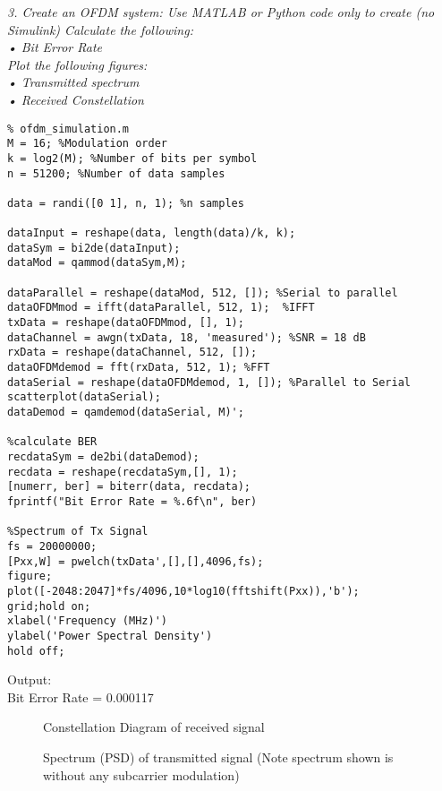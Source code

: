 \documentclass[a4paper]{article}
\begin{document}
\bigskip
\textit{3. Create an OFDM system: Use MATLAB or Python code only to create (no Simulink) Calculate the following:\\
    • Bit Error Rate\\
Plot the following figures:\\
    • Transmitted spectrum\\
    • Received Constellation\\
}
\bigskip
{}
\begin{verbatim}
% ofdm_simulation.m
M = 16; %Modulation order
k = log2(M); %Number of bits per symbol
n = 51200; %Number of data samples

data = randi([0 1], n, 1); %n samples

dataInput = reshape(data, length(data)/k, k);
dataSym = bi2de(dataInput);
dataMod = qammod(dataSym,M);

dataParallel = reshape(dataMod, 512, []); %Serial to parallel
dataOFDMmod = ifft(dataParallel, 512, 1);  %IFFT
txData = reshape(dataOFDMmod, [], 1);
dataChannel = awgn(txData, 18, 'measured'); %SNR = 18 dB
rxData = reshape(dataChannel, 512, []);
dataOFDMdemod = fft(rxData, 512, 1); %FFT
dataSerial = reshape(dataOFDMdemod, 1, []); %Parallel to Serial
scatterplot(dataSerial);
dataDemod = qamdemod(dataSerial, M)';

%calculate BER
recdataSym = de2bi(dataDemod);
recdata = reshape(recdataSym,[], 1);
[numerr, ber] = biterr(data, recdata);
fprintf("Bit Error Rate = %.6f\n", ber)

%Spectrum of Tx Signal
fs = 20000000;
[Pxx,W] = pwelch(txData',[],[],4096,fs);    
figure;
plot([-2048:2047]*fs/4096,10*log10(fftshift(Pxx)),'b'); 
grid;hold on;
xlabel('Frequency (MHz)')
ylabel('Power Spectral Density')
hold off;
\end{verbatim}
Output:\\
Bit Error Rate = 0.000117
\begin{figure}[hbt!]
    \centering
  
  \caption{Constellation Diagram of received signal}
\end{figure}
\begin{figure}[hbt!]
    \centering
  
  \caption{Spectrum (PSD) of transmitted signal (Note spectrum shown is without any subcarrier modulation)}
\end{figure}
\end{document}
